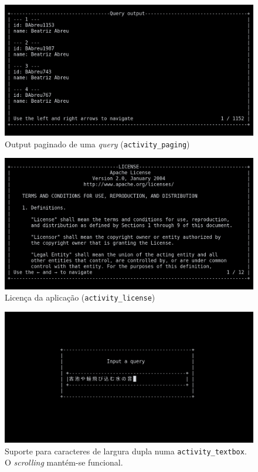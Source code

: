 \documentclass[11pt, a4paper]{article}
\begin{document}
\begin{figure}[H]
    \centering
    \includegraphics[scale=0.25]{res-fase2/interactive_screenshots/paging.png}
    \caption{Output paginado de uma \emph{query} (\texttt{activity\_paging})}
    \label{fig:paging}
\end{figure}

\begin{figure}[H]
    \centering
    \includegraphics[scale=0.25]{res-fase2/interactive_screenshots/license.png}
	\caption{Licença da aplicação (\texttt{activity\_license})}
    \label{fig:license}
\end{figure}

\begin{figure}[H]
    \centering
    \includegraphics[scale=0.25]{res-fase2/interactive_screenshots/japanese.png}
    \caption{Suporte para caracteres de largura dupla numa \texttt{activity\_textbox}.
             O \emph{scrolling} mantém-se funcional.}
    \label{fig:japanese}
\end{figure}
\end{document}
